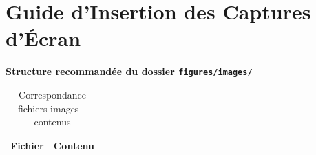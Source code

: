\chapter{Guide d'Insertion des Captures d'Écran}
\label{ann:guide_images}

\begin{center}
\textbf{Structure recommandée du dossier \texttt{figures/images/}}
\end{center}
\begin{table}[H]
\centering
\caption{Correspondance fichiers images – contenus}
\label{tab:images_guide}
\small
\renewcommand{\arraystretch}{1.2}
\begin{tabularx}{\textwidth}{>{\ttfamily}l X}
\toprule
\textbf{Fichier} & \textbf{Contenu} \\
\midrule


\end{tabularx}
\end{table}
